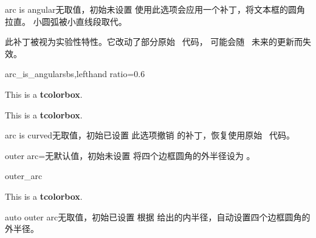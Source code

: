 \clearpage
\begin{docTcbKey}[][doc new=2015-05-05]{arc is angular}{}{无取值，初始未设置}
  使用此选项会应用一个补丁，将文本框的圆角拉直。
  小圆弧被小直线段取代。
  \begin{marker}
  此补丁被视为实验性特性。它改动了部分原始 \tikzname\ 代码，
  可能会随 \tikzname\ 未来的更新而失效。
  \end{marker}

\begin{exdispExample*}{arc_is_angular}{sbs,lefthand ratio=0.6}

\begin{tcolorbox}
This is a \textbf{tcolorbox}.
\end{tcolorbox}
\begin{tcolorbox}
This is a \textbf{tcolorbox}.
\end{tcolorbox}
\end{exdispExample*}

\end{docTcbKey}


\begin{docTcbKey}[][doc new=2015-05-05]{arc is curved}{}{无取值，初始已设置}
  此选项撤销  的补丁，恢复使用原始 \tikzname\ 代码。
\end{docTcbKey}


\begin{docTcbKey}{outer arc}{=}{无默认值，初始未设置}
  将四个边框圆角的外半径设为 。
\begin{exdispExample}{outer_arc}

\begin{tcolorbox}[arc=4mm,outer arc=1mm]
This is a \textbf{tcolorbox}.
\end{tcolorbox}
\end{exdispExample}
\end{docTcbKey}


\begin{docTcbKey}{auto outer arc}{}{无取值，初始已设置}
  根据  给出的内半径，自动设置四个边框圆角的外半径。
\end{docTcbKey}


\clearpage
